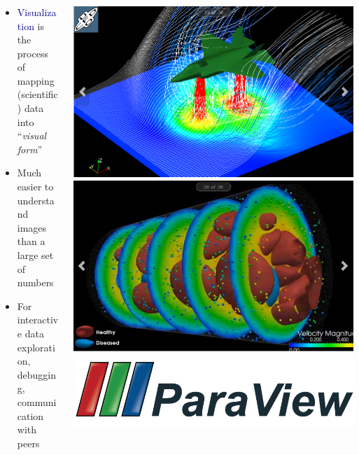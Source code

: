 \begin{frame}
    \frametitle{}
    \framesubtitle{}

    \begin{columns} %
    \begin{column}{5.25cm}
        \begin{itemize}
                \item \textcolor{DarkBlue}{Visualization} is the process of mapping (scientific) data into ``{\it visual form}''
                \item Much easier to understand images than a large set of numbers
                \item For interactive data exploration, debugging, communication with peers
        \end{itemize}
    \end{column}
    \begin{column}{7cm}
        \href{http://www.paraview.org/gallery/}{\includegraphics[width=.475\columnwidth]{figs/paraview/ParaView-gallery01}}
        \href{http://www.paraview.org/gallery/}{\includegraphics[width=.475\columnwidth]{figs/paraview/ParaView-gallery03}}
        \centering
        \href{http://www.paraview.org}{\includegraphics[width=.45\columnwidth]{./figs/visit-logos/ParaViewLogo}}



\end{column}
\end{columns}
\end{frame}
